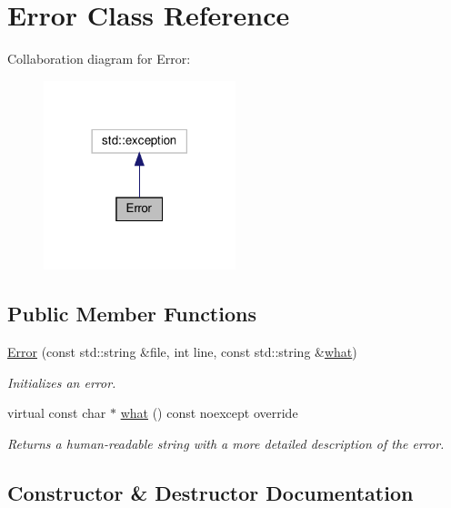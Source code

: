 \hypertarget{classError}{}\section{Error Class Reference}
\label{classError}


Collaboration diagram for Error\+:
\nopagebreak
\begin{figure}[H]
\begin{center}
\leavevmode
\includegraphics[width=158pt]{classError__coll__graph}
\end{center}
\end{figure}
\subsection*{Public Member Functions}
\begin{DoxyCompactItemize}
\item 
\hyperlink{classError_a146e7d37cbd73162b88a91ffa7fa776a}{Error} (const std\+::string \&file, int line, const std\+::string \&\hyperlink{classError_aeca4bfa7822e73acddcb68276dc1f306}{what})
\begin{DoxyCompactList}\small\item\em Initializes an error. \end{DoxyCompactList}\item 
\mbox{\label{classError_aeca4bfa7822e73acddcb68276dc1f306}} 
virtual const char $\ast$ \hyperlink{classError_aeca4bfa7822e73acddcb68276dc1f306}{what} () const noexcept override
\begin{DoxyCompactList}\small\item\em Returns a human-\/readable string with a more detailed description of the error. \end{DoxyCompactList}\end{DoxyCompactItemize}


\subsection{Constructor \& Destructor Documentation}
\mbox{\label{classError_a146e7d37cbd73162b88a91ffa7fa776a}} 
